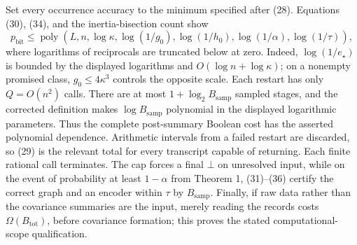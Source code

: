 Set every occurrence accuracy to the minimum specified after (28).  Equations (30), (34), and the inertia-bisection count show
\[
 p_{\mathrm{bit}}\le
 \operatorname{poly}\!\left(L,n,\log\kappa,
 \log(1/g_0),\log(1/h_0),\log(1/\alpha),\log(1/\tau)\right),
\]
where logarithms of reciprocals are truncated below at zero.  Indeed, \(\log(1/e_{\star})\) is bounded by the displayed logarithms and \(O(\log n+\log\kappa)\); on a nonempty promised class, \(g_0\le4\kappa^3\) controls the opposite scale.  Each restart has only \(Q=O(n^2)\) calls.  There are at most \(1+\log_2 B_{\mathrm{samp}}\) sampled stages, and the corrected definition makes \(\log B_{\mathrm{samp}}\) polynomial in the displayed logarithmic parameters.  Thus the complete post-summary Boolean cost has the asserted polynomial dependence.  Arithmetic intervals from a failed restart are discarded, so (29) is the relevant total for every transcript capable of returning.  Each finite rational call terminates.  The cap forces a final \(\bot\) on unresolved input, while on the event of probability at least \(1-\alpha\) from Theorem 1, (31)--(36) certify the correct graph and an encoder within \(\tau\) by \(B_{\mathrm{samp}}\).  Finally, if raw data rather than the covariance summaries are the input, merely reading the records costs \(\Omega(B_{\mathrm{tot}})\), before covariance formation; this proves the stated computational-scope qualification.
